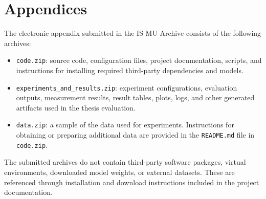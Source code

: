 \documentclass[
  digital,     %
  oneside,     %
  nosansbold,  %
  nocolorbold, %
  lof,         %
  lot,         %
]{fithesis4}
\begin{document}

%


% 


% 

% 






\chapter*{Appendices}

The electronic appendix submitted in the IS MU Archive consists of the following archives:

\begin{itemize}
    \item \texttt{code.zip}: source code, configuration files, project documentation, scripts, and instructions for installing required third-party dependencies and models.
    \item \texttt{experiments\_and\_results.zip}: experiment configurations, evaluation outputs, measurement results, result tables, plots, logs, and other generated artifacts used in the thesis evaluation.
    \item \texttt{data.zip}: a sample of the data used for experiments. Instructions for obtaining or preparing additional data are provided in the \texttt{README.md} file in \texttt{code.zip}.
\end{itemize}

The submitted archives do not contain third-party software packages, virtual environments, downloaded model weights, or external datasets. These are referenced through installation and download instructions included in the project documentation.


\printbibliography[heading=bibintoc]
\end{document}
